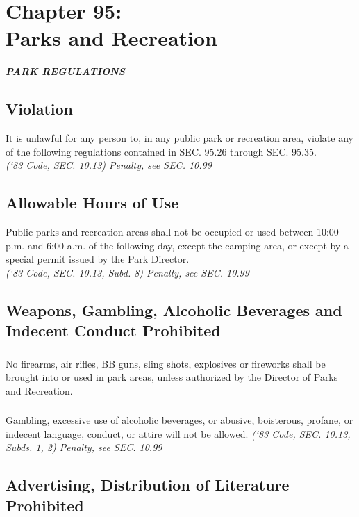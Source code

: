 \chapter*{Chapter 95: \\
	Parks and Recreation}
    \minitoc
    \pagebreak

\begin{center}
\emph{\textbf{\LARGE{PARK REGULATIONS}}}
\end{center}
\setcounter{section}{24}
\section{Violation}
It is unlawful for any person to, in any public park or recreation area, violate any of the following regulations contained in SEC. 95.26 through SEC. 95.35.\\
\emph{(‘83 Code, SEC. 10.13)  Penalty, see SEC. 10.99}
\section{Allowable Hours of Use}
Public parks and recreation areas shall not be occupied or used between 10:00 p.m. and 6:00 a.m. of the following day, except the camping area, or except by a special permit issued by the Park Director.\\
\emph{(‘83 Code, SEC. 10.13, Subd. 8) Penalty, see SEC. 10.99}
\section{Weapons, Gambling, Alcoholic Beverages and Indecent Conduct Prohibited}
\subsection{}
No firearms, air rifles, BB guns, sling shots, explosives or fireworks shall be brought into or used in park areas, unless authorized by the Director of Parks and Recreation.
\subsection{}
Gambling, excessive use of alcoholic beverages, or abusive, boisterous, profane, or indecent language, conduct, or attire will not be allowed.
\emph{(‘83 Code, SEC. 10.13, Subds. 1, 2)  Penalty, see SEC. 10.99}
\section{Advertising, Distribution of Literature Prohibited}
